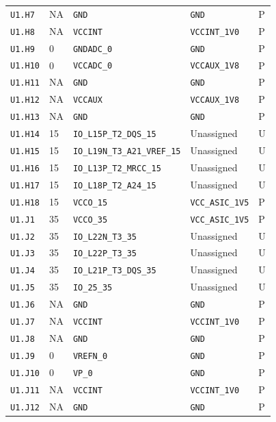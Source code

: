 \documentclass[11pt,a4paper]{article}
\begin{document}
\begin{longtable}{@{}P{20mm}P{10mm}P{70mm}P{51mm}P{11mm}@{}}
\nolinkurl{U1.H7} & NA & \nolinkurl{GND} & \nolinkurl{GND} & P \\
\nolinkurl{U1.H8} & NA & \nolinkurl{VCCINT} & \nolinkurl{VCCINT_1V0} & P \\
\nolinkurl{U1.H9} & 0 & \nolinkurl{GNDADC_0} & \nolinkurl{GND} & P \\
\nolinkurl{U1.H10} & 0 & \nolinkurl{VCCADC_0} & \nolinkurl{VCCAUX_1V8} & P \\
\nolinkurl{U1.H11} & NA & \nolinkurl{GND} & \nolinkurl{GND} & P \\
\nolinkurl{U1.H12} & NA & \nolinkurl{VCCAUX} & \nolinkurl{VCCAUX_1V8} & P \\
\nolinkurl{U1.H13} & NA & \nolinkurl{GND} & \nolinkurl{GND} & P \\
\nolinkurl{U1.H14} & 15 & \nolinkurl{IO_L15P_T2_DQS_15} & Unassigned & U \\
\nolinkurl{U1.H15} & 15 & \nolinkurl{IO_L19N_T3_A21_VREF_15} & Unassigned & U \\
\nolinkurl{U1.H16} & 15 & \nolinkurl{IO_L13P_T2_MRCC_15} & Unassigned & U \\
\nolinkurl{U1.H17} & 15 & \nolinkurl{IO_L18P_T2_A24_15} & Unassigned & U \\
\nolinkurl{U1.H18} & 15 & \nolinkurl{VCCO_15} & \nolinkurl{VCC_ASIC_1V5} & P \\
\nolinkurl{U1.J1} & 35 & \nolinkurl{VCCO_35} & \nolinkurl{VCC_ASIC_1V5} & P \\
\nolinkurl{U1.J2} & 35 & \nolinkurl{IO_L22N_T3_35} & Unassigned & U \\
\nolinkurl{U1.J3} & 35 & \nolinkurl{IO_L22P_T3_35} & Unassigned & U \\
\nolinkurl{U1.J4} & 35 & \nolinkurl{IO_L21P_T3_DQS_35} & Unassigned & U \\
\nolinkurl{U1.J5} & 35 & \nolinkurl{IO_25_35} & Unassigned & U \\
\nolinkurl{U1.J6} & NA & \nolinkurl{GND} & \nolinkurl{GND} & P \\
\nolinkurl{U1.J7} & NA & \nolinkurl{VCCINT} & \nolinkurl{VCCINT_1V0} & P \\
\nolinkurl{U1.J8} & NA & \nolinkurl{GND} & \nolinkurl{GND} & P \\
\nolinkurl{U1.J9} & 0 & \nolinkurl{VREFN_0} & \nolinkurl{GND} & P \\
\nolinkurl{U1.J10} & 0 & \nolinkurl{VP_0} & \nolinkurl{GND} & P \\
\nolinkurl{U1.J11} & NA & \nolinkurl{VCCINT} & \nolinkurl{VCCINT_1V0} & P \\
\nolinkurl{U1.J12} & NA & \nolinkurl{GND} & \nolinkurl{GND} & P \\

\end{longtable}
\end{document}
